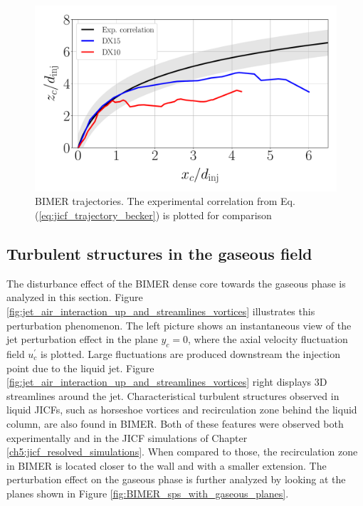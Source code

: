 \begin{figure}[ht]
\centering
   \includegraphics[scale=0.3]{./part3_applications/figures_ch8_resolved/trajectories_BIMER}
   \caption[BIMER trajectories]{BIMER trajectories. The experimental correlation from Eq. (\ref{eq:jicf_trajectory_becker})  is plotted for comparison}
\label{fig:BIMER_trajectories}
\end{figure}


\subsection{Turbulent structures in the gaseous field}
\label{subsec:ch8_turbulent_structures_BIMER}

The disturbance effect of the BIMER dense core towards the gaseous phase is analyzed in this section. Figure \ref{fig:jet_air_interaction_up_and_streamlines_vortices} illustrates this perturbation phenomenon. The left picture shows an instantaneous view of the jet perturbation effect in the plane $y_c = 0$, where the axial velocity fluctuation field $u^\prime_c$ is plotted. Large fluctuations are produced downstream the injection point due to the liquid jet. Figure \ref{fig:jet_air_interaction_up_and_streamlines_vortices} right displays 3D streamlines around the jet.  Characteristical turbulent structures observed in liquid JICFs, such as horseshoe vortices and recirculation zone behind the liquid column, are also found in BIMER. Both of these features were observed both experimentally and in the JICF simulations of Chapter \ref{ch5:jicf_resolved_simulations}. When compared to those, the recirculation zone in BIMER is located closer to the wall and with a smaller extension. The perturbation effect on the gaseous phase is further analyzed by looking at the planes shown in Figure \ref{fig:BIMER_sps_with_gaseous_planes}. 

